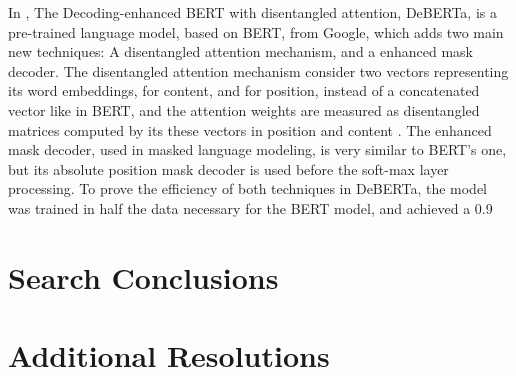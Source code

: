 In \citet{DBLP.journals.corr.abs-2006-03654}, The Decoding-enhanced BERT with disentangled attention, DeBERTa, is a pre-trained language model, based on BERT, from Google, which adds two main new techniques: A disentangled attention mechanism, and a enhanced mask decoder. The disentangled attention mechanism consider two vectors representing its word embeddings, for content, and for position, instead of a concatenated vector like in BERT, and the attention weights are measured as disentangled matrices computed by its these vectors in position and content . The enhanced mask decoder, used in masked language modeling, is very similar to BERT’s one, but its absolute position mask decoder is used before the soft-max layer processing. To prove the efficiency of both techniques in DeBERTa, the model was trained in half the data necessary for the BERT model, and achieved a 0.9%

\section{Search Conclusions}

\subsection{\RQI}

\subsection{\RQII}

\subsection{\RQIII}

\section{Additional Resolutions}




